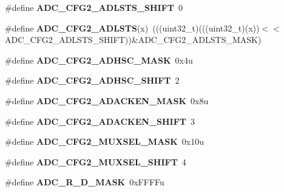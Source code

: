 \begin{DoxyCompactItemize}
\#define {\bfseries A\+D\+C\+\_\+\+C\+F\+G2\+\_\+\+A\+D\+L\+S\+T\+S\+\_\+\+S\+H\+I\+FT}~0
\item 
\mbox{\label{group___a_d_c___register___masks_gae23653c06f0dfe00b27a15ef15138c8e}} 
\#define {\bfseries A\+D\+C\+\_\+\+C\+F\+G2\+\_\+\+A\+D\+L\+S\+TS}(x)~(((uint32\+\_\+t)(((uint32\+\_\+t)(x))$<$$<$A\+D\+C\+\_\+\+C\+F\+G2\+\_\+\+A\+D\+L\+S\+T\+S\+\_\+\+S\+H\+I\+FT))\&A\+D\+C\+\_\+\+C\+F\+G2\+\_\+\+A\+D\+L\+S\+T\+S\+\_\+\+M\+A\+SK)
\item 
\mbox{\label{group___a_d_c___register___masks_ga73cb928c5cacb18e02a3f0d67dcf1e6f}} 
\#define {\bfseries A\+D\+C\+\_\+\+C\+F\+G2\+\_\+\+A\+D\+H\+S\+C\+\_\+\+M\+A\+SK}~0x4u
\item 
\mbox{\label{group___a_d_c___register___masks_ga447389268d77124eb2012fd98bfe07ce}} 
\#define {\bfseries A\+D\+C\+\_\+\+C\+F\+G2\+\_\+\+A\+D\+H\+S\+C\+\_\+\+S\+H\+I\+FT}~2
\item 
\mbox{\label{group___a_d_c___register___masks_ga1158034a83b78e238c3f8ca481ab9b27}} 
\#define {\bfseries A\+D\+C\+\_\+\+C\+F\+G2\+\_\+\+A\+D\+A\+C\+K\+E\+N\+\_\+\+M\+A\+SK}~0x8u
\item 
\mbox{\label{group___a_d_c___register___masks_gad009e6fe93b9f44fb0f79cd479d8bb1a}} 
\#define {\bfseries A\+D\+C\+\_\+\+C\+F\+G2\+\_\+\+A\+D\+A\+C\+K\+E\+N\+\_\+\+S\+H\+I\+FT}~3
\item 
\mbox{\label{group___a_d_c___register___masks_ga5c50199c9b27cb92554a647909c6338a}} 
\#define {\bfseries A\+D\+C\+\_\+\+C\+F\+G2\+\_\+\+M\+U\+X\+S\+E\+L\+\_\+\+M\+A\+SK}~0x10u
\item 
\mbox{\label{group___a_d_c___register___masks_ga3d74b5bda99558af8b4f0e986ef7ea9b}} 
\#define {\bfseries A\+D\+C\+\_\+\+C\+F\+G2\+\_\+\+M\+U\+X\+S\+E\+L\+\_\+\+S\+H\+I\+FT}~4
\item 
\mbox{\label{group___a_d_c___register___masks_ga7dadc81f58826b303fb83918820cd177}} 
\#define {\bfseries A\+D\+C\+\_\+\+R\+\_\+\+D\+\_\+\+M\+A\+SK}~0x\+F\+F\+F\+Fu
$$
\end{DoxyCompactItemize}
